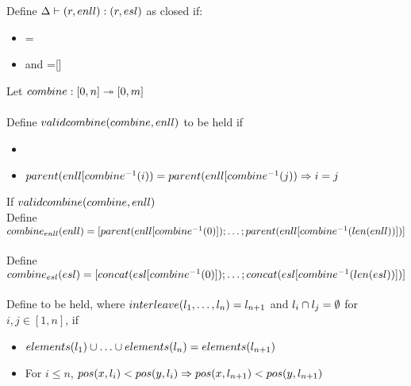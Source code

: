 \documentclass{article}
\begin{document}
Define $\Delta \vdash (r,enll) : (r, esl)$ as closed if:
\begin{itemize}
\item \Length{\ExampleNumberListList} = \Length{\ExampleStringList}
\item \Parented{\ExampleNumberListList} and \Parent{\ExampleNumberListList}=[]
\end{itemize}

Let $combine : [0,n] \twoheadrightarrow [0,m]$\\\\
Define $validcombine(combine,enll)$ to be held if 
\begin{itemize}
\item \Parented{\ExampleNumberListList[\Combine^{-1}(i)]}
\item $parent(enll[combine^{-1}(i)) = parent(enll[combine^{-1}(j)) \Rightarrow i = j$
\end{itemize}

If $validcombine(combine,enll)$\\
Define $combine_{enll}(enll) = [parent(enll[combine^{-1}(0)]) ; \ldots ; parent(enll[combine^{-1}(len(enll))])]$\\\\
Define $combine_{esl}(esl) = [concat(esl[combine^{-1}(0)]) ; \ldots ; concat(esl[combine^{-1}(len(esl))])]$\\\\

Define \Interleaving{\Interleave} to be held, where $interleave(l_1,\ldots,l_n)=l_{n+1}$ and $l_i \cap l_j = \emptyset$ for $i,j \in [1,n]$, if\\
\begin{itemize}
\item $elements(l_1)\cup \ldots \cup elements(l_n) = elements(l_{n+1})$
\item For $i\leq n$, $pos(x,l_i) < pos(y,l_i) \Rightarrow pos(x,l_{n+1}) < pos(y,l_{n+1})$
\end{itemize}
\end{document}
